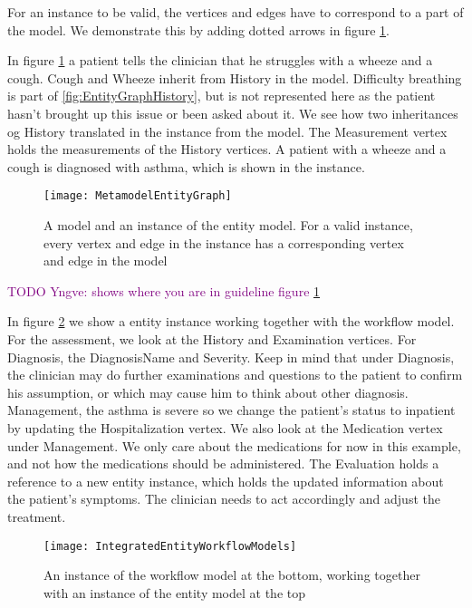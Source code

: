 For an instance to be valid, the vertices and edges have to correspond to a part of the model. We demonstrate this by adding dotted arrows in figure \ref{fig:MetamodelEntityGraph}. 

In figure \ref{fig:MetamodelEntityGraph} a patient tells the clinician that he struggles with a wheeze and a cough. Cough and Wheeze inherit from History in the model. Difficulty breathing is part of \ref{fig:EntityGraphHistory}, but is not represented here as the patient hasn't brought up this issue or been asked about it. We see how two inheritances og History translated in the instance from the model. The Measurement vertex holds the measurements of the History vertices. A patient with a wheeze and a cough is diagnosed with asthma, which is shown in the instance.

\begin{figure}[h!]
	\texttt{[image: MetamodelEntityGraph]}
	\caption {A model and an instance of the entity model. For a valid instance, every vertex and edge in the instance has a corresponding vertex and edge in the model}
		\label{fig:MetamodelEntityGraph}
\end{figure}

\textcolor{purple}{TODO Yngve: shows where you are in guideline figure \ref{fig:MetamodelEntityGraph}}

In figure \ref{fig:IntegratedEntityWorkflowModels} we show a entity instance working together with the workflow model. For the assessment, we look at the History and Examination vertices. For Diagnosis, the DiagnosisName and Severity. Keep in mind that under Diagnosis, the clinician may do further examinations and questions to the patient to confirm his assumption, or which may cause him to think about other diagnosis. Management, the asthma is severe so we change the patient's status to inpatient by updating the Hospitalization vertex. We also look at the Medication vertex under Management. We only care about the medications for now in this example, and not how the medications should be administered. The Evaluation holds a reference to a new entity instance, which holds the updated information about the patient's symptoms. The clinician needs to act accordingly and adjust the treatment.

\begin{figure}[h!]
	\texttt{[image: IntegratedEntityWorkflowModels]}
		\caption {An instance of the workflow model at the bottom, working together with an instance of the entity model at the top}
		\label{fig:IntegratedEntityWorkflowModels}
\end{figure}


